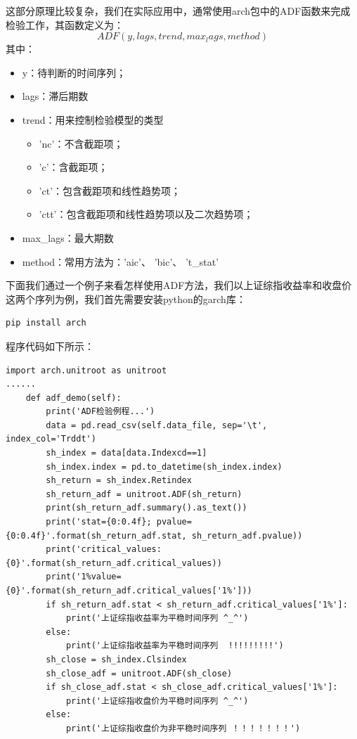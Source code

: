 \documentclass{article}
\begin{document}
这部分原理比较复杂，我们在实际应用中，通常使用arch包中的ADF函数来完成检验工作，其函数定义为：
\begin{equation}
ADF(y, lags, trend, max_lags, method)
\label{e000049}
\end{equation}
其中：
\begin{itemize}
\item y：待判断的时间序列；
\item lags：滞后期数
\item trend：用来控制检验模型的类型
	\begin{itemize}
	\item 'nc'：不含截距项；
	\item 'c'：含截距项；
	\item 'ct'：包含截距项和线性趋势项；
	\item 'ctt'：包含截距项和线性趋势项以及二次趋势项；
	\end{itemize}
\item max\_lags：最大期数
\item method：常用方法为：'aic'、 'bic'、 't\_stat'
\end{itemize}
下面我们通过一个例子来看怎样使用ADF方法，我们以上证综指收益率和收盘价这两个序列为例，我们首先需要安装python的garch库：
\lstset{language=BASH}
\begin{lstlisting}
pip install arch
\end{lstlisting}
程序代码如下所示：
\begin{lstlisting}
import arch.unitroot as unitroot
......
    def adf_demo(self):
        print('ADF检验例程...')
        data = pd.read_csv(self.data_file, sep='\t', index_col='Trddt')
        sh_index = data[data.Indexcd==1]
        sh_index.index = pd.to_datetime(sh_index.index)
        sh_return = sh_index.Retindex
        sh_return_adf = unitroot.ADF(sh_return)
        print(sh_return_adf.summary().as_text())
        print('stat={0:0.4f}; pvalue={0:0.4f}'.format(sh_return_adf.stat, sh_return_adf.pvalue))
        print('critical_values:{0}'.format(sh_return_adf.critical_values))
        print('1%value={0}'.format(sh_return_adf.critical_values['1%']))
        if sh_return_adf.stat < sh_return_adf.critical_values['1%']:
            print('上证综指收益率为平稳时间序列 ^_^')
        else:
            print('上证综指收益率为平稳时间序列  !!!!!!!!!')
        sh_close = sh_index.Clsindex
        sh_close_adf = unitroot.ADF(sh_close)
        if sh_close_adf.stat < sh_close_adf.critical_values['1%']:
            print('上证综指收盘价为平稳时间序列 ^_^')
        else:
            print('上证综指收盘价为非平稳时间序列 ！！！！！！！')
\end{lstlisting}
\end{document}
